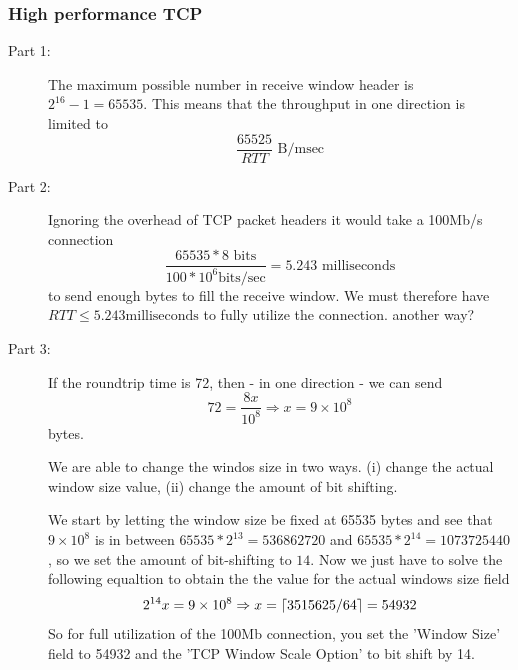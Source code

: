 \subsubsection{High performance TCP}
\begin{description}
    \item[Part 1:] The maximum possible number in receive window header is
        $2^{16}-1 = 65535$. This means that the throughput in one direction is
        limited to \[\frac{65525}{RTT} \text{ B/msec}\] %
    \item[Part 2:] Ignoring the overhead of TCP packet headers it would take a
        100Mb/s connection \[ \frac{65535 * 8 \text{ bits}}{100 * 10^{6} \text{
        bits/sec}} = 5.243 \text{ milliseconds} \] to send enough bytes to fill
        the receive window. We must therefore have $RTT \leq 5.243 \text{
        milliseconds}$ to fully utilize the connection. %
        another way?
    \item[Part 3:] If the roundtrip time is 72, then - in one direction - we
        can send $$72=\frac{8x}{10^8} \Rightarrow x = 9 \times 10^8$$ bytes.
        
        We are able to change the windos size in two ways. (i) change the
        actual window size value, (ii) change the amount of bit shifting.
        
        We start by letting the window size be fixed at 65535 bytes and see
        that $9\times10^8$ is in between $65535*2^{13}=536862720$ and
        $65535*2^{14}=1073725440$, so we set the amount of bit-shifting to
        $14$. Now we just have to solve the following equaltion to obtain the
        the value for the actual windows size field $$2^{14}x=9\times10^8 \Rightarrow x=\left\lceil{3515625/64}\right\rceil = 54932$$
        So for full utilization of the 100Mb connection, you set the 'Window
        Size' field to 54932 and the 'TCP Window Scale Option' to bit shift by
        14.


\end{description}

